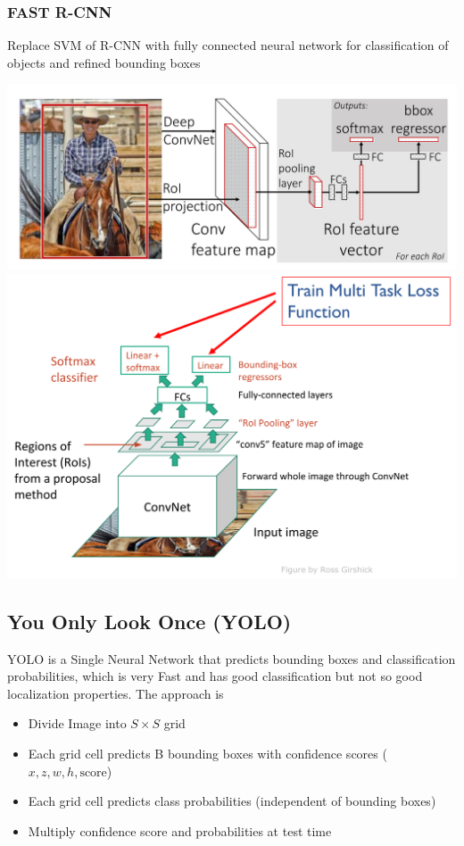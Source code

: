 \documentclass[x11names,11pt,a4paper]{article}
\theoremstyle{definition}
\begin{document}
\subsubsection{FAST R-CNN}
Replace SVM of R-CNN with fully connected neural network for classification of objects and refined bounding boxes
\begin{center}
	\includegraphics[width=0.7\linewidth]{img/fast_r-cnn_structure}
	\includegraphics[width=0.7\linewidth]{img/fast_r-cnn_structure2}
\end{center}

\subsection{You Only Look Once (YOLO)}
YOLO is a Single Neural Network that predicts bounding boxes and classification probabilities, which is very Fast and has good classification but not so good localization properties. The approach is
\begin{itemize}[label=-,nosep]
	\item Divide Image into $S \times S$ grid
	\item Each grid cell predicts B bounding boxes with confidence scores ($x, z, w, h, \text{score}$)
	\item Each grid cell predicts class probabilities (independent of bounding boxes)
	\item Multiply confidence score and probabilities at test time
\end{itemize}
\end{document}
